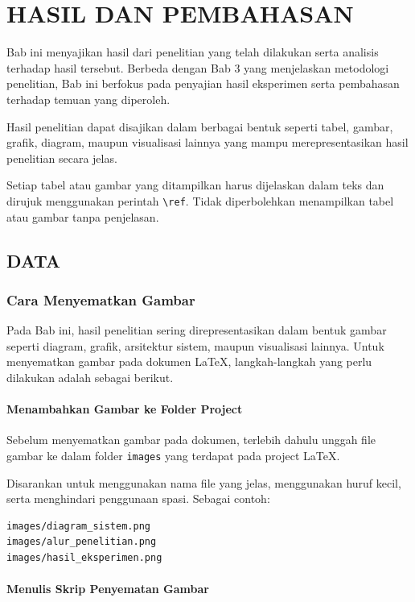 \chapter{HASIL DAN PEMBAHASAN}

Bab ini menyajikan hasil dari penelitian yang telah dilakukan serta
analisis terhadap hasil tersebut. Berbeda dengan Bab 3 yang menjelaskan
metodologi penelitian, Bab ini berfokus pada penyajian hasil eksperimen
serta pembahasan terhadap temuan yang diperoleh.

Hasil penelitian dapat disajikan dalam berbagai bentuk seperti tabel,
gambar, grafik, diagram, maupun visualisasi lainnya yang mampu
merepresentasikan hasil penelitian secara jelas.

Setiap tabel atau gambar yang ditampilkan harus dijelaskan dalam teks
dan dirujuk menggunakan perintah \texttt{\textbackslash ref}. Tidak
diperbolehkan menampilkan tabel atau gambar tanpa penjelasan.

\section{DATA}
\subsection{Cara Menyematkan Gambar}

Pada Bab ini, hasil penelitian sering direpresentasikan dalam bentuk gambar
seperti diagram, grafik, arsitektur sistem, maupun visualisasi lainnya.
Untuk menyematkan gambar pada dokumen \LaTeX, langkah-langkah yang perlu
dilakukan adalah sebagai berikut.

\subsubsection{Menambahkan Gambar ke Folder Project}

Sebelum menyematkan gambar pada dokumen, terlebih dahulu unggah file gambar
ke dalam folder \texttt{images} yang terdapat pada project \LaTeX.

Disarankan untuk menggunakan nama file yang jelas, menggunakan huruf kecil,
serta menghindari penggunaan spasi. Sebagai contoh:

\begin{verbatim}
images/diagram_sistem.png
images/alur_penelitian.png
images/hasil_eksperimen.png
\end{verbatim}

\subsubsection{Menulis Skrip Penyematan Gambar}

